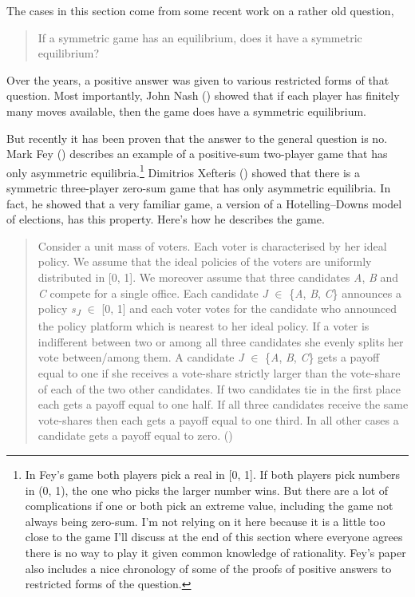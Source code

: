 \documentclass[
  12pt,
  letterpaper,
  DIV=11,
  numbers=noendperiod]{scrreprt}
\begin{document}
The cases in this section come from some recent work on a rather old
question,

\begin{quote}
If a symmetric game has an equilibrium, does it have a symmetric
equilibrium?
\end{quote}

Over the years, a positive answer was given to various restricted forms
of that question. Most importantly, John Nash
() showed that if each player has finitely
many moves available, then the game does have a symmetric equilibrium.

But recently it has been proven that the answer to the general question
is no. Mark Fey () describes an example of a
positive-sum two-player game that has only asymmetric
equilibria.\footnote{In Fey's game both players pick a real in {[}0,
  1{]}. If both players pick numbers in (0, 1), the one who picks the
  larger number wins. But there are a lot of complications if one or
  both pick an extreme value, including the game not always being
  zero-sum. I'm not relying on it here because it is a little too close
  to the game I'll discuss at the end of this section where everyone
  agrees there is no way to play it given common knowledge of
  rationality. Fey's paper also includes a nice chronology of some of
  the proofs of positive answers to restricted forms of the question.}
Dimitrios Xefteris () showed that there
is a symmetric three-player zero-sum game that has only asymmetric
equilibria. In fact, he showed that a very familiar game, a version of a
Hotelling--Downs model of elections, has this property. Here's how he
describes the game.

\begin{quote}
Consider a unit mass of voters. Each voter is characterised by her ideal
policy. We assume that the ideal policies of the voters are uniformly
distributed in {[}0, 1{]}. We moreover assume that three candidates
\emph{A}, \emph{B} and \emph{C} compete for a single office. Each
candidate \emph{J} \(\in\) \{\emph{A}, \emph{B}, \emph{C}\} announces a
policy \emph{s\textsubscript{J}} \(\in\) {[}0, 1{]} and each voter votes
for the candidate who announced the policy platform which is nearest to
her ideal policy. If a voter is indifferent between two or among all
three candidates she evenly splits her vote between/among them. A
candidate \emph{J} \(\in\) \{\emph{A}, \emph{B}, \emph{C}\} gets a
payoff equal to one if she receives a vote-share strictly larger than
the vote-share of each of the two other candidates. If two candidates
tie in the first place each gets a payoff equal to one half. If all
three candidates receive the same vote-shares then each gets a payoff
equal to one third. In all other cases a candidate gets a payoff equal
to zero. ()
\end{quote}
\end{document}
